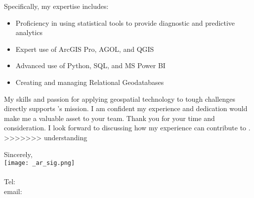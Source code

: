 \documentclass[letterpaper]{article}
\newenvironment{itemlist}
        {
            \vspace{-12pt}
            \begin{itemize} \itemsep 0pt
        }{
            \end{itemize}
            \vspace{-3pt}
        }
\newenvironment{itemlist}
        {
            \vspace{-12pt}
            \begin{itemize} \itemsep 0pt
        }{
            \end{itemize}
            \vspace{-3pt}
        }
\begin{document}
Specifically, my expertise includes:
\begin{itemlist}
\item Proficiency in using statistical tools to provide diagnostic and predictive analytics
\item Expert use of ArcGIS Pro, AGOL, and QGIS
\item Advanced use of Python, SQL, and MS Power BI
\item Creating and managing Relational Geodatabases
\end{itemlist}

My skills and passion for applying geospatial technology to tough challenges directly supports {\JobCompany}’s mission.
I am confident my experience and dedication would make me a valuable asset to your team.
Thank you for your time and consideration.
I look forward to discussing how my experience can contribute to {\JobCompany}.
>>>>>>> understanding

Sincerely,\\
    \hspace{1em}
    \texttt{[image: \_ar\_sig.png]} \\
    \CVsigname \\
    \small
    Tel: \CVphone \\
    email: \CVemail
\end{document}
